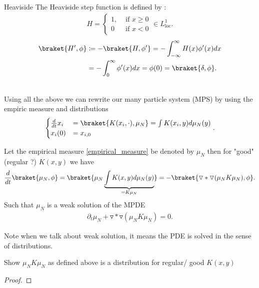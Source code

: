 \begin{example}{Heaviside}
The Heaviside step function is defined by :
\begin{align*}
  H = \begin{cases}
    1, &\text{ if }x\ge 0 \\
    0 &\text{ if } x<0
  \end{cases} \in  L_{\text{loc}}^{1} 
.\end{align*}
\begin{align*}
  \braket{H',\phi } &\coloneqq  - \braket{H,\phi'} = - \int_{-\infty}^{\infty} H(x)\phi'(x) dx\\
                    &= - \int_0^{\infty} \phi'(x) dx = \phi(0)  =\braket{\delta,\phi }
.\end{align*}
\begin{figure}[h]
  \begin{center}
  \end{center}
\end{figure}
\end{example}
\hspace{0mm}\\
Using all the above we can rewrite our many particle system  (MPS) by using the empiric measure and distributions 
\begin{align*}
  \begin{cases}
    \frac{d}{dt} x_i &=  \braket{K(x_i,\cdot) , \mu_N}  = \int K(x_i,y) d\mu_N(y)\\ 
    x_i(0) &= x_{i,0}
  \end{cases}
.\end{align*}
\begin{theorem}
Let the empirical measure \ref{empirical_measure} be denoted by $\mu_N$ then for "good" (regular ?)  $K(x,y)$ we have 
\begin{align*}
  \frac{d}{dt} \braket{\mu_N,\phi } = \braket{\mu_N \underbrace{\int K(x,y) d\mu_N(y)}_{=  K \mu_N}}= -\braket{\triangledown * \triangledown(\mu_N K\mu_N),\phi }
.\end{align*}
Such that $\mu_N$ is a weak solution of the MPDE
\begin{align*}
  \partial_t \mu_N + \triangledown * \triangledown(\mu_N K\mu_N) = 0
.\end{align*}  
\end{theorem}
\begin{remark}
 Note when we talk about weak solution, it means the PDE is solved in the sense of distributions.
\end{remark}
\begin{exercise}
 Show $\mu_N K \mu_N$ as defined above is a distribution for regular/ good $K(x,y)$
\end{exercise}
\begin{proof}
  
\end{proof}

